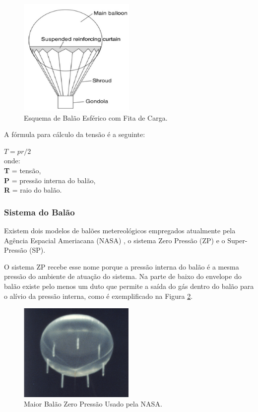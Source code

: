 	\begin{figure}[H]
		\centering
		\includegraphics[width=0.5\textwidth]{figuras/balaoEsferico}
		\caption{Esquema de Balão Esférico com Fita de Carga.}
		\label{img:balaoEsferico}
	\end{figure}

	A fórmula para cálculo da tensão é a seguinte:

	$T = pr/2$ \\
	onde: \\
	\textbf{T} = tensão, \\
	\textbf{P} = pressão interna do balão, \\
	\textbf{R} = raio do balão. \\

\subsubsection{Sistema do Balão}

	Existem dois modelos de balões metereológicos empregados atualmente pela Agência Espacial Ameriacana (NASA) , o sistema Zero Pressão (ZP) e o Super-Pressão (SP).

	O sistema ZP recebe esse nome porque a pressão interna do balão é a mesma  pressão do ambiente de atuação do sistema. Na parte de baixo do envelope do balão existe pelo menos um duto que permite a saída do gás dentro do balão para o alívio da pressão interna, como é exemplificado na Figura \ref{img:maiorBalaoZeroPressao}.

	\begin{figure}[H]
		\centering
		\includegraphics[width=0.5\textwidth]{figuras/maiorBalaoZeroPressao}
		\caption{Maior Balão Zero Pressão Usado pela NASA.}
		\label{img:maiorBalaoZeroPressao}
	\end{figure}

